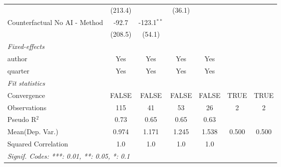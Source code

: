 \begin{tabular}{lcccccc}
                                 & (213.4)       &               & (36.1)        &         &      &   \\   
   Counterfactual No AI - Method & -92.7         & -123.1$^{**}$ &               &         &      &   \\   
                                 & (208.5)       & (54.1)        &               &         &      &   \\   
   \midrule
   \emph{Fixed-effects}\\
   author                        & Yes           & Yes           & Yes           & Yes     &      & \\  
   quarter                       & Yes           & Yes           & Yes           & Yes     &      & \\  
   \midrule
   \emph{Fit statistics}\\
   Convergence                   &FALSE          & FALSE         & FALSE         & FALSE   & TRUE & TRUE\\  
   Observations                  & 115           & 41            & 53            & 26      & 2    & 2\\  
   Pseudo R$^2$                  & 0.73          & 0.65          & 0.65          & 0.63    &      & \\  
Mean(Dep. Var.) & 0.974 & 1.171 & 1.245 & 1.538 & 0.500 & 0.500 \\
   Squared Correlation           & 1.0           & 1.0           & 1.0           & 1.0     &      & \\  
   \midrule \midrule
   \multicolumn{7}{l}{\emph{Signif. Codes: ***: 0.01, **: 0.05, *: 0.1}}\\
\end{tabular}
\par\endgroup
